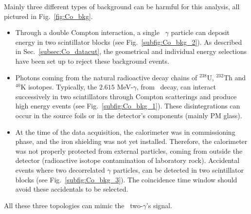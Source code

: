 Mainly three different types of background can be harmful for this analysis, all pictured in Fig.~\ref{fig:Co_bkg}.
\begin{itemize}
\item Through a double Compton interaction, a single \Co\ $\gamma$ particle can deposit energy in two scintillator blocks (see Fig.~\ref{subfig:Co_bkg_2}).
As described in Sec.~\ref{subsec:Co_datacut}, the geometrical and individual energy selections have been set up to reject these background events.
\item Photons coming from the natural radioactive decay chains of $^{238}$U, $^{232}$Th and $^{40}$K isotopes.
Typically, the $2.615$ MeV-$\gamma$, from \Tl\ decay, can interact successively in two scintillators through Compton scatterings and produce high energy events (see Fig.~\ref{subfig:Co_bkg_1}).
These disintegrations can occur in the source foils or in the detector's components (mainly PM glass).
\item At the time of the data acquisition, the calorimeter was in commissioning phase, and the iron shielding was not yet installed.
Therefore, the calorimeter was not properly protected from external particles, coming from outside the detector (radioactive isotope contamination of laboratory rock).
Accidental events where two decorrelated $\gamma$ particles, can be detected in two scintillator blocks (see Fig.~\ref{subfig:Co_bkg_3}).
The coincidence time window should avoid these accidentals to be selected.
\end{itemize}
All these three topologies can mimic the \Co\ two-$\gamma$'s signal.
